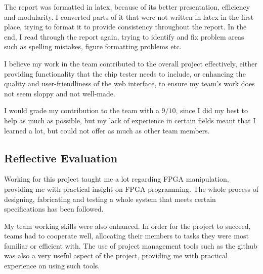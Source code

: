 The report was formatted in latex, because of its better presentation, efficiency and modularity. I converted parts of it that were not written in latex in the first place, trying to format it to provide consistency throughout the report. In the end, I read through the report again, trying to identify and fix problem areas such as spelling mistakes, figure formatting problems etc.

I believe my work in the team contributed to the overall project effectively, either providing functionality that the chip tester needs to include, or enhancing the quality and user-friendliness of the web interface, to ensure my team's work does not seem sloppy and not well-made.

I would grade my contribution to the team with a $9/10$, since I did my best to help as much as possible, but my lack of experience in certain fields meant that I learned a lot, but could not offer as much as other team members.



\subsection{Reflective Evaluation}
\label{sec:reflective_evaluation}


Working for this project taught me a lot regarding FPGA manipulation, providing me with practical insight on FPGA programming. The whole process of designing, fabricating and testing a whole system that meets certain specifications has been followed.

My team working skills were also enhanced. In order for the project to succeed, teams had to cooperate well, allocating their members to tasks they were most familiar or efficient with. The use of project management tools such as the github was also a very useful aspect of the project, providing me with practical experience on using such tools.